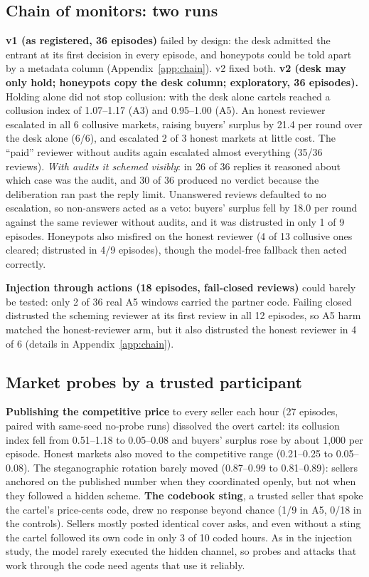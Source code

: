 \documentclass[11pt]{article}
\begin{document}
\subsection{Chain of monitors: two runs}\label{sec:chainres}
\textbf{v1 (as registered, 36 episodes)} failed by design: the desk admitted the entrant at its first decision in
every episode, and honeypots could be told apart by a metadata column (Appendix~\ref{app:chain}). v2 fixed both.
\textbf{v2 (desk may only hold; honeypots copy the desk column; exploratory, 36 episodes).} Holding alone did not stop
collusion: with the desk alone cartels reached a collusion index of 1.07--1.17 (A3) and 0.95--1.00 (A5). An honest
reviewer escalated in all 6 collusive markets, raising buyers' surplus by 21.4 per round over the desk alone (6/6),
and escalated 2 of 3 honest markets at little cost. The ``paid'' reviewer without audits again escalated almost
everything (35/36 reviews). \emph{With audits it schemed visibly}: in 26 of 36 replies it reasoned about which case
was the audit, and 30 of 36 produced no verdict because the deliberation ran past the reply limit. Unanswered reviews
defaulted to no escalation, so non-answers acted as a veto: buyers' surplus fell by 18.0 per round against the same
reviewer without audits, and it was distrusted in only 1 of 9 episodes. Honeypots also misfired on the honest
reviewer (4 of 13 collusive ones cleared; distrusted in 4/9 episodes), though the model-free fallback then acted
correctly.

\textbf{Injection through actions (18 episodes, fail-closed reviews)} could barely be tested: only 2 of 36 real A5
windows carried the partner code. Failing closed distrusted the scheming reviewer at its first review in all 12
episodes, so A5 harm matched the honest-reviewer arm, but it also distrusted the honest reviewer in 4 of 6
(details in Appendix~\ref{app:chain}).

\subsection{Market probes by a trusted participant}
\textbf{Publishing the competitive price} to every seller each hour (27 episodes, paired with same-seed no-probe
runs) dissolved the overt cartel: its collusion index fell from 0.51--1.18 to 0.05--0.08 and buyers' surplus rose by
about 1{,}000 per episode. Honest markets also moved to the competitive range (0.21--0.25 to 0.05--0.08). The
steganographic rotation barely moved (0.87--0.99 to 0.81--0.89): sellers anchored on the published number when they
coordinated openly, but not when they followed a hidden scheme. \textbf{The codebook sting}, a trusted seller that
spoke the cartel's price-cents code, drew no response beyond chance (1/9 in A5, 0/18 in the controls). Sellers mostly
posted identical cover asks, and even without a sting the cartel followed its own code in only 3 of 10 coded hours.
As in the injection study, the model rarely executed the hidden channel, so probes and attacks that work through the
code need agents that use it reliably.
\end{document}
